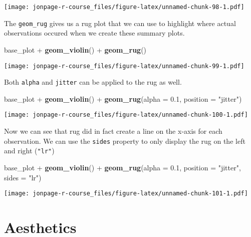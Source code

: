\documentclass[]{book}
\newenvironment{Shaded}{\begin{snugshade}}{\end{snugshade}}
\newcommand{\KeywordTok}[1]{\textcolor[rgb]{0.13,0.29,0.53}{\textbf{{#1}}}}
\newcommand{\DataTypeTok}[1]{\textcolor[rgb]{0.13,0.29,0.53}{{#1}}}
\newcommand{\FloatTok}[1]{\textcolor[rgb]{0.00,0.00,0.81}{{#1}}}
\newcommand{\StringTok}[1]{\textcolor[rgb]{0.31,0.60,0.02}{{#1}}}
\newcommand{\NormalTok}[1]{{#1}}
\theoremstyle{definition}
\theoremstyle{definition}
\theoremstyle{remark}
\begin{document}
\texttt{[image: jonpage-r-course\_files/figure-latex/unnamed-chunk-98-1.pdf]}

The \texttt{geom\_rug} gives us a rug plot that we can use to highlight
where actual observations occured when we create these summary plots.

\begin{Shaded}
\begin{Highlighting}[]
\NormalTok{base_plot +}\StringTok{ }\KeywordTok{geom_violin}\NormalTok{() +}\StringTok{ }\KeywordTok{geom_rug}\NormalTok{()}
\end{Highlighting}
\end{Shaded}

\texttt{[image: jonpage-r-course\_files/figure-latex/unnamed-chunk-99-1.pdf]}

Both \texttt{alpha} and \texttt{jitter} can be applied to the rug as
well.

\begin{Shaded}
\begin{Highlighting}[]
\NormalTok{base_plot +}\StringTok{ }\KeywordTok{geom_violin}\NormalTok{() +}\StringTok{ }\KeywordTok{geom_rug}\NormalTok{(}\DataTypeTok{alpha =} \FloatTok{0.1}\NormalTok{, }\DataTypeTok{position =} \StringTok{"jitter"}\NormalTok{)}
\end{Highlighting}
\end{Shaded}

\texttt{[image: jonpage-r-course\_files/figure-latex/unnamed-chunk-100-1.pdf]}

Now we can see that rug did in fact create a line on the x-axis for each
observation. We can use the \texttt{sides} property to only display the
rug on the left and right (\texttt{"lr"})

\begin{Shaded}
\begin{Highlighting}[]
\NormalTok{base_plot +}\StringTok{ }\KeywordTok{geom_violin}\NormalTok{() +}\StringTok{ }\KeywordTok{geom_rug}\NormalTok{(}\DataTypeTok{alpha =} \FloatTok{0.1}\NormalTok{, }\DataTypeTok{position =} \StringTok{"jitter"}\NormalTok{, }\DataTypeTok{sides =} \StringTok{"lr"}\NormalTok{)}
\end{Highlighting}
\end{Shaded}

\texttt{[image: jonpage-r-course\_files/figure-latex/unnamed-chunk-101-1.pdf]}

\section{Aesthetics}\label{aesthetics}
\end{document}

